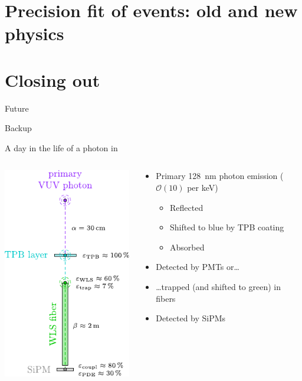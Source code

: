 \documentclass[10pt,aspectratio=169]{beamer}
\begin{document}
\section{Precision fit of \texorpdfstring{\nnbb}{2nubb} events: old and new physics}
\section{Closing out}
\begin{frame}{Future}
\end{frame}
\appendix
\begin{frame}[standout]{}
  Backup
\end{frame}
\begin{frame}{A day in the life of a photon in \gerda}
  \begin{columns}
    \begin{column}{0.3\textwidth}
      \includegraphics[height=0.85\textheight]{light-coll-chain.pdf}
    \end{column}
    \begin{column}{0.7\textwidth}
      \begin{itemize}
        \item Primary 128~nm photon emission ($\mathcal{O}(10)$ per keV)
          \begin{itemize}
            \item Reflected
            \item Shifted to blue by TPB coating
            \item Absorbed
          \end{itemize}
        \item Detected by PMTs or\ldots
        \item \ldots{}trapped (and shifted to green) in fibers
        \item Detected by SiPMs
      \end{itemize}
    \end{column}
  \end{columns}
\end{frame}
\end{document}
